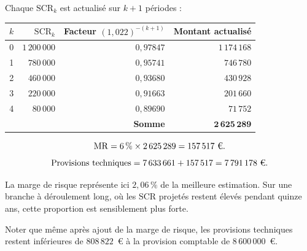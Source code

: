 \begin{corrige}
Chaque $\mathrm{SCR}_k$ est actualisé sur $k+1$ périodes :
\begin{center}\small
\begin{tabular}{crrr}
\toprule
$k$ & $\mathrm{SCR}_k$ & Facteur $(1{,}022)^{-(k+1)}$ & Montant actualisé \\
\midrule
0 & $1\,200\,000$ & $0{,}97847$ & $1\,174\,168$ \\
1 & $780\,000$    & $0{,}95741$ & $746\,780$ \\
2 & $460\,000$    & $0{,}93680$ & $430\,928$ \\
3 & $220\,000$    & $0{,}91663$ & $201\,660$ \\
4 & $80\,000$     & $0{,}89690$ & $71\,752$ \\
\midrule
\multicolumn{3}{r}{\textbf{Somme}} & $\mathbf{2\,625\,289}$ \\
\bottomrule
\end{tabular}
\end{center}
\[
  \mathrm{MR} = 6\,\% \times 2\,625\,289 = 157\,517\ \text{\euro}.
\]
\[
  \text{Provisions techniques} = 7\,633\,661 + 157\,517 = 7\,791\,178\ \text{\euro}.
\]

\medskip
La marge de risque représente ici $2{,}06\,\%$ de la meilleure estimation. Sur
une branche à déroulement long, où les $\mathrm{SCR}$ projetés restent élevés
pendant quinze ans, cette proportion est sensiblement plus forte.

Noter que même après ajout de la marge de risque, les provisions techniques
restent inférieures de $808\,822$~\euro{} à la provision comptable de
$8\,600\,000$~\euro.
\end{corrige}

